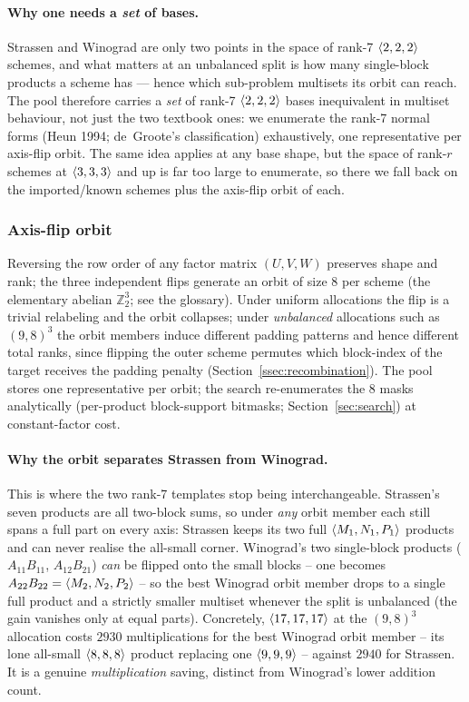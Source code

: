 \paragraph{Why one needs a \emph{set} of bases.} Strassen and Winograd are only two points
in the space of rank-7 \(\langle 2, 2, 2 \rangle\) schemes, and what matters at an unbalanced
split is how many single-block products a scheme has --- hence which sub-problem multisets
its orbit can reach. The pool therefore carries a \emph{set} of rank-7
\(\langle 2, 2, 2 \rangle\) bases inequivalent in multiset behaviour, not
just the two textbook ones: we enumerate the rank-7 normal forms (Heun 1994; de~Groote's
classification) exhaustively, one representative per axis-flip orbit. The same idea applies
at any base shape, but the space of rank-\(r\) schemes at \(\langle 3, 3, 3 \rangle\) and up is
far too large to enumerate, so there we fall back on the imported/known schemes plus the
axis-flip orbit of each.

\subsubsection{Axis-flip orbit}
\label{ssec:axis-flip}

Reversing the row order of any factor matrix \((U, V, W)\) preserves shape and rank; the
three independent flips generate an orbit of size 8 per scheme (the elementary abelian
\(\mathbb{Z}_2^3\); see the glossary). Under uniform allocations the
flip is a trivial relabeling and the orbit collapses; under \emph{unbalanced} allocations
such as \((9, 8)^3\) the orbit members induce different padding patterns and hence
different total ranks, since flipping the outer scheme permutes which block-index of the
target receives the padding penalty (Section~\ref{ssec:recombination}). The pool stores
one representative per orbit; the search re-enumerates the 8 masks analytically
(per-product block-support bitmasks; Section~\ref{sec:search}) at constant-factor cost.

\paragraph{Why the orbit separates Strassen from Winograd.} This is where the two rank-7
templates stop being interchangeable. Strassen's seven products are all two-block sums, so
under \emph{any} orbit member each still spans a full part on every axis: Strassen keeps
its two full \(\langle M_1, N_1, P_1 \rangle\) products and can never realise the all-small
corner. Winograd's two single-block products (\(A_{11}B_{11}\), \(A_{12}B_{21}\))
\emph{can} be flipped onto the small blocks -- one becomes
\(A_{22}B_{22} = \langle M_2, N_2, P_2 \rangle\) -- so the best Winograd orbit member drops to a
single full product and a strictly smaller multiset whenever the split is unbalanced (the
gain vanishes only at equal parts). Concretely, \(\langle 17, 17, 17 \rangle\) at the
\((9,8)^3\) allocation costs \(2930\) multiplications for
the best Winograd orbit member -- its lone all-small \(\langle 8, 8, 8 \rangle\) product
replacing one \(\langle 9, 9, 9 \rangle\) -- against \(2940\) for Strassen. It is a genuine
\emph{multiplication} saving, distinct from Winograd's lower addition count.

